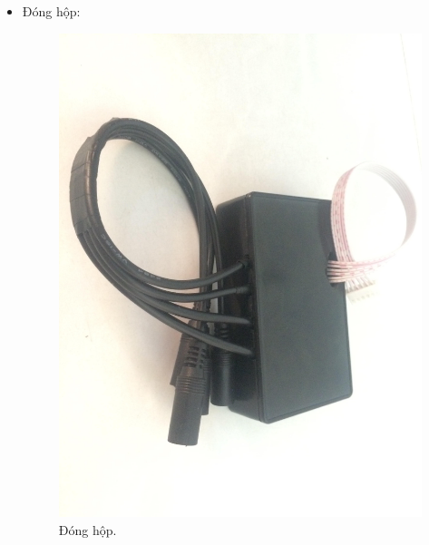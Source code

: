 \documentclass[a4paper,12pt,oneside]{article}
\begin{document}
\begin{itemize}
\item Đóng hộp:
	\begin{figure}[H]
	\begin{center}
	\includegraphics[scale=.15]{hinh/relay_box.jpg}
	\end{center}
	\caption{Đóng hộp.}
	\end{figure}
\end{itemize}
\end{document}
